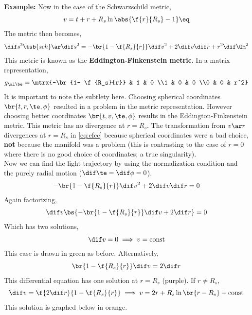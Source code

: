 \documentclass{article}
\begin{document}
\textbf{Example:} Now in the case of the Schwarzschild metric,
\[ v = t+r + R_s \ln \abs{\f{r}{R_s} - 1} \eq \label{eq:efcc}\]
The metric then becomes,
\[ \dif s^2\tsb{sch} \ar \dif s^2 = - \br{1- \f{R_s}{r}} \dif v^2 + 2 \dif v \dif r + r^2 \dif \Om^2 \]
This metric is known as the \textbf{Eddington-Finkenstein metric}. In a matrix representation,
\[ g_{\al\be} = \mtrx{-\br{1- \f{R_s}{r}} & 1 & 0 \\1 & 0 & 0 \\0 & 0 & r^2} \]
It is important to note the subtlety here. Choosing spherical coordinates $\br{t, r, \te, \phi}$ resulted in a problem in the metric representation. However choosing better coordinates $\br{t, v, \te, \phi}$ results in the Eddington-Finkenstein metric. This metric has no divergence at $r = R_s$. The transformation from $v \ar r$ divergences at $r = R_s$ in \eqref{eq:efcc} because spherical coordinates were a bad choice, \textbf{not} because the manifold was a problem (this is contrasting to the case of $r=0$ where there is no good choice of coordinates; a true singularity). \\

Now we can find the light trajectory by using the normalization condition and the purely radial motion ($\dif \te = \dif \phi = 0 $).
\[ - \br{1- \f{R_s}{r}}  \dif v^2 + 2 \dif v \dif r = 0 \]
Again factorizing,
\[ \dif v \bs{- \br{1- \f{R_s}{r}}  \dif v + 2 \dif r} = 0 \]
Which has two solutions,
\[ \dif v = 0 \implies v = \text{const} \]
This case is drawn in green as before. Alternatively,
\[ \br{1 - \f{R_s}{r}} \dif v = 2 \dif r \]
This differential equation has one solution at $r = R_s$ (purple). If $r \neq R_s$,
\[ \dif v = \f{2 \dif r}{ 1 - \f{R_s}{r}} \implies v = 2 r + R_s \ln\br{r - R_s} + \text{const} \]
This solution is graphed below in orange.
\begin{center}
\end{center}
\end{document}
